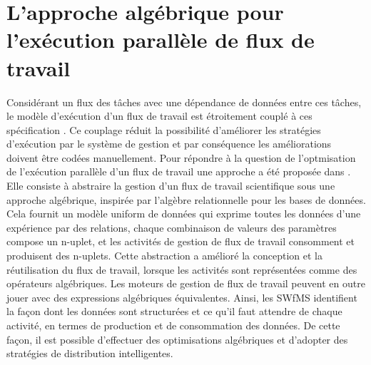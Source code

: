 \section[L'approche algébrique]{L'approche algébrique pour l'exécution parallèle de flux de travail }

 Considérant un flux des tâches avec une dépendance de données entre ces tâches, le modèle d'exécution d'un flux de travail est étroitement couplé à ces spécification \cite{san}. Ce couplage réduit la possibilité d'améliorer les stratégies d'exécution par le système de gestion et par conséquence les améliorations doivent être codées manuellement. Pour répondre à la question de l'optmisation de l'exécution parallèle d'un flux de travail une approche a été proposée dans \cite{oga11}. Elle consiste à abstraire la gestion d'un flux de travail scientifique sous une approche algébrique, inspirée par l'algèbre relationnelle pour les bases de données. Cela fournit un modèle uniform de données qui exprime toutes les données d'une expérience par des relations, chaque combinaison de valeurs des paramètres compose un n-uplet, et les activités de gestion de flux de travail consomment et produisent des n-uplets. Cette abstraction a amélioré la conception et la réutilisation du flux de travail, lorsque les activités sont représentées comme des opérateurs algébriques. Les moteurs de gestion de flux de travail peuvent en outre jouer avec des expressions algébriques équivalentes. Ainsi, les SWfMS identifient la façon dont les données sont structurées et ce qu'il faut attendre de chaque activité, en termes de production et de consommation des données. De cette façon, il est possible d'effectuer des optimisations algébriques et d'adopter des stratégies de distribution intelligentes. 
 


